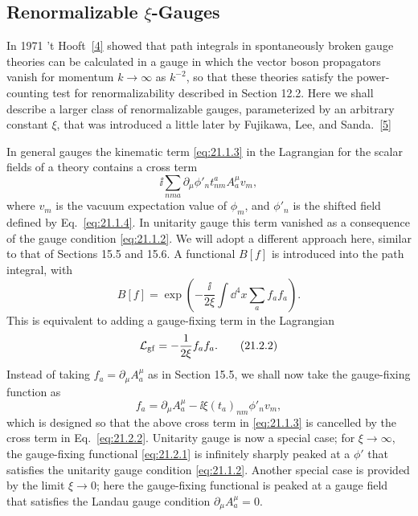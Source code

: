 \subsection{\texorpdfstring{Renormalizable $\xi$-Gauges}{Renormalizable xi-Gauges}}
\label{sec:21.2}

In 1971 't Hooft~\hyperref[ch21-ref-4]{[4]} showed that path integrals in
spontaneously broken gauge theories can be calculated in a gauge in which
the vector boson propagators vanish for momentum $k\to\infty$ as $k^{-2}$,
so that these theories satisfy the power-counting test for renormalizability
described in Section 12.2. Here we shall describe a larger class of
renormalizable gauges, parameterized by an arbitrary constant $\xi$, that
was introduced a little later by Fujikawa, Lee, and
Sanda.~\hyperref[ch21-ref-5]{[5]}

In general gauges the kinematic term \eqref{eq:21.1.3} in the Lagrangian for
the scalar fields of a theory contains a cross term
\begin{equation*}
 \ii\sum_{nma}\partial_\mu\phi'_n
 t^a_{nm}A_a^\mu v_m,
\end{equation*}
where $v_m$ is the vacuum expectation value of $\phi_m$, and $\phi'_n$ is
the shifted field defined by Eq.~\eqref{eq:21.1.4}. In unitarity gauge this
term vanished as a consequence of the gauge condition \eqref{eq:21.1.2}.
We will adopt a different approach here, similar to that of Sections 15.5
and 15.6. A functional $B[f]$ is introduced into the path integral, with
\begin{equation}
 B[f]=\exp\left(
 -\frac{\ii}{2\xi}\int \dd^4x\sum_a f_a f_a
 \right).
 \tag{21.2.1}\label{eq:21.2.1}
\end{equation}
This is equivalent to adding a gauge-fixing term in the Lagrangian
\begin{equation}
 \mathcal L_{\rm gf}=-\frac1{2\xi}f_a f_a.
 \tag{21.2.2}\label{eq:21.2.2}
\end{equation}
Instead of taking $f_a=\partial_\mu A_a^\mu$ as in Section 15.5,
we shall now take the gauge-fixing function as
\begin{equation}
 f_a=\partial_\mu A_a^\mu
 -\ii\xi(t_a)_{nm}\phi'_n v_m,
 \tag{21.2.3}\label{eq:21.2.3}
\end{equation}
which is designed so that the above cross term in \eqref{eq:21.1.3} is
cancelled by the cross term in Eq.~\eqref{eq:21.2.2}. Unitarity gauge is now
a special case; for $\xi\to\infty$, the gauge-fixing functional
\eqref{eq:21.2.1} is infinitely sharply peaked at a $\phi'$ that satisfies
the unitarity gauge condition \eqref{eq:21.1.2}. Another special case is
provided by the limit $\xi\to0$; here the gauge-fixing functional is peaked
at a gauge field that satisfies the Landau gauge condition
$\partial_\mu A_a^\mu=0$.

